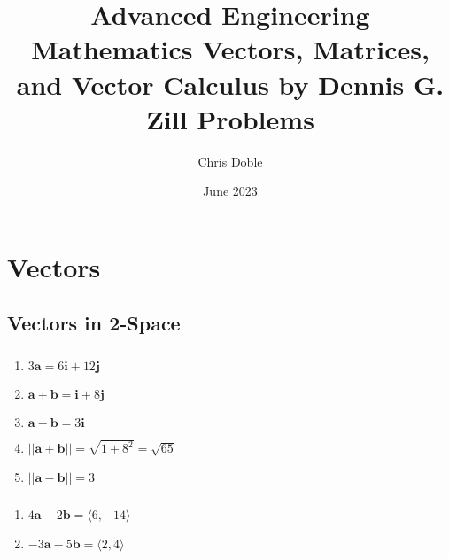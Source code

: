 \documentclass{article}
\title{Advanced Engineering Mathematics Vectors, Matrices, and Vector Calculus by Dennis G. Zill Problems}
\author{Chris Doble}
\date{June 2023}
\begin{document}
\maketitle

\tableofcontents

\section{Vectors}

\subsection{Vectors in 2-Space}

\subsubsection{}

\begin{enumerate}
  \item $3 \mathbf{a} = 6 \mathbf{i} + 12 \mathbf{j}$

  \item $\mathbf{a} + \mathbf{b} = \mathbf{i} + 8 \mathbf{j}$

  \item $\mathbf{a} - \mathbf{b} = 3 \mathbf{i}$

  \item $||\mathbf{a} + \mathbf{b}|| = \sqrt{1 + 8^2} = \sqrt{65}$

  \item $||\mathbf{a} - \mathbf{b}|| = 3$
\end{enumerate}

\setcounter{subsubsection}{8}
\subsubsection{}

\begin{enumerate}
  \item $4 \mathbf{a} - 2 \mathbf{b} = \langle 6, -14 \rangle$

  \item $-3 \mathbf{a} - 5 \mathbf{b} = \langle 2, 4 \rangle$
\end{enumerate}

\setcounter{subsubsection}{14}
\subsubsection{}
\end{document}
